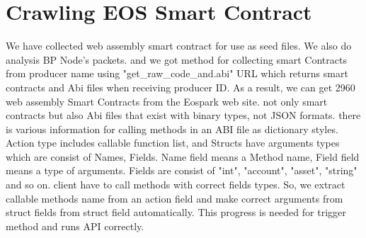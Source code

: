 \section{Crawling EOS Smart Contract}
We have collected web assembly smart contract for use as seed files.
We also do analysis BP Node's packets. and we got method for collecting smart Contracts from producer name using "get\_raw\_code\_and.abi" URL which returns smart contracts and Abi files when receiving producer ID. As a result, we can get 2960 web assembly Smart Contracts from the Eospark web site. not only smart contracts but also Abi files that exist with binary types, not JSON formats. 
there is various information for calling methods in an ABI file as dictionary styles. Action type includes callable function list, and Structs have arguments types which are consist of Names, Fields. Name field means a Method name, Field field means a type of arguments.
Fields are consist of "int", "account", "asset", "string" and so on. client have to call methods with correct fields types. So, we extract callable methods name from an action field and make correct arguments from struct fields from struct field automatically. This progress is needed for trigger method and runs API correctly.

